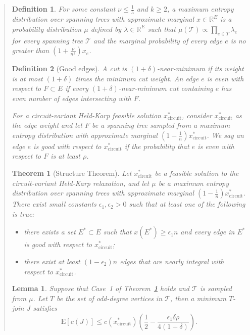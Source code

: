 \documentclass[11pt,letterpaper]{article}
\newtheorem{lemma}{Lemma}
\newtheorem{thm}{Theorem}
\newtheorem{defn}{Definition}
\newcommand{\E}{\mathrm{E}}
\begin{document}
\begin{quote}
\begin{defn}\label{d:approxm}
For some constant $\nu\leq\frac{1}{5}$ and $k\geq 2$, a \emph{maximum entropy distribution over spanning trees with approximate marginal} $x\in\mathbb{R}^E$ is a probability distribution $\mu$ defined by $\lambda\in\mathbb{R}^E$ such that $\mu(\mathscr{T})\propto\prod_{e\in T}\lambda_e$ for every spanning tree $\mathscr{T}$ and the marginal probability of every edge $e$ is no greater than $(1+\frac{\nu}{n^k})x_e$.
\end{defn}

\begin{defn}[Good edges]\label{d:goodedges}
A cut is $(1+\delta)$-near-minimum if its weight is at most $(1+\delta)$ times the minimum cut weight. An edge $e$ is \emph{even} with respect to $F\subset E$ if every $(1+\delta)$-near-minimum cut containing $e$ has even number of edges intersecting with $F$.

For a circuit-variant Held-Karp feasible solution $x^*_{\mathrm{circuit}}$, consider $x^*_{\mathrm{circuit}}$ as the edge weight and let $F$ be a spanning tree sampled from a maximum entropy distribution with approximate marginal $(1-\frac{1}{n}) x^*_{\mathrm{circuit}}$. We say an edge $e$ is \emph{good} with respect to $x^*_{\mathrm{circuit}}$ if the probability that $e$ is even with respect to $F$ is at least $\rho$.
\end{defn}

\begin{thm}[Structure Theorem]
\label{t:structure}
Let $x^*_{\mathrm{circuit}}$ be a feasible solution to the circuit-variant Held-Karp relaxation, and let $\mu$ be a maximum entropy distribution over spanning trees with approximate marginal $(1-\frac{1}{n}) x^*_{\mathrm{circuit}}$. There exist small constants $\epsilon_1 , \epsilon_2 >0$ such that at least one of the following is true:\begin{itemize}
\item[1.] there exists a set $E^*\subset E$ such that $x(E^*)\geq \epsilon_1 n$ and every edge in $E^*$ is good with respect to $x^*_{\mathrm{circuit}}$;
\item[2.] there exist at least $(1-\epsilon_2)n$ edges that are nearly integral with respect to $x^*_{\mathrm{circuit}}$.
\end{itemize}
\end{thm}

\begin{lemma}
\label{l:case1}
Suppose that Case~1 of Theorem~\ref{t:structure} holds and $\mathscr{T}$ is sampled from $\mu$. Let $T$ be the set of odd-degree vertices in $\mathscr{T}$, then a minimum $T$-join $J$ satisfies\[
\E[c(J)]\leq c(x^*_{\mathrm{circuit}}) (\frac{1}{2}-\frac{\epsilon_1\delta\rho}{4(1+\delta)})
.\]
\end{lemma}


\end{quote}
\end{document}
